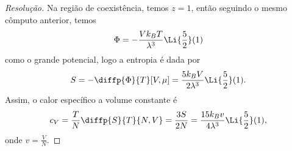 \begin{proof}[Resolução]
    Na região de coexistência, temos \(z = 1\), então seguindo o mesmo cômputo anterior, temos
    \begin{equation*}
        \Phi = -\frac{Vk_B T}{\lambda^3}\Li{\frac52}(1)
    \end{equation*}
    como o grande potencial, logo a entropia é dada por
    \begin{equation*}
        S = - \diffp{\Phi}{T}[V, \mu] = \frac{5k_B V}{2 \lambda^3}\Li{\frac52}(1).
    \end{equation*}
    Assim, o calor específico a volume constante é
    \begin{equation*}
        c_V = \frac{T}{N} \diffp{S}{T}{N, V} = \frac{3S}{2N} = \frac{15 k_B v}{4 \lambda^3}\Li{\frac52}(1),
    \end{equation*}
    onde \(v = \frac{V}{N}\).
\end{proof}
